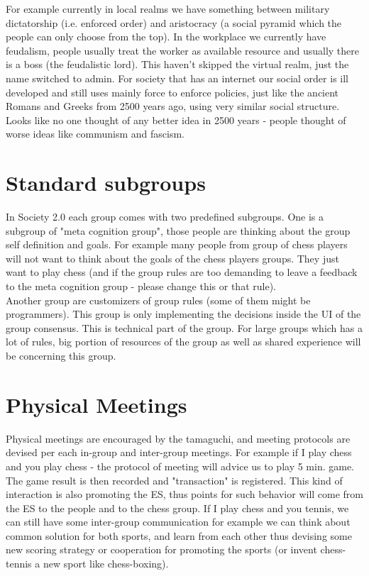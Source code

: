 \documentclass{article}
\begin{document}
For example currently in local realms we have something between military dictatorship (i.e. enforced order) and aristocracy (a social pyramid which the people can only choose from the top). In the workplace we currently have feudalism, people usually treat the worker as available resource and usually there is a boss (the feudalistic lord). This haven't skipped the virtual realm, just the name switched to admin. For society that has an internet our social order is ill developed and still uses mainly force to enforce policies, just like the ancient Romans and Greeks from 2500 years ago, using very similar social structure. Looks like no one thought of any better idea in 2500 years - people thought of worse ideas like communism and fascism. 

\section{Standard subgroups}

In Society 2.0 each group comes with two predefined subgroups. One is a subgroup of "meta cognition group", those people are thinking about the group self definition and goals. For example many people from group of chess players will not want to think about the goals of the chess players groups. They just want to play chess (and if the group rules are too demanding to leave a feedback to the meta cognition group - please change this or that rule). \\

Another group are customizers of group rules (some of them might be programmers). This group is only implementing the decisions inside the UI of the group consensus. This is technical part of the group. For large groups which has a lot of rules, big portion of resources of the group as well as shared experience will be concerning this group. 

\section{Physical Meetings}

Physical meetings are encouraged by the tamaguchi, and meeting protocols are devised per each in-group and inter-group meetings. For example if I play chess and you play chess - the protocol of meeting will advice us to play 5 min. game. The game result is then recorded and "transaction" is registered. This kind of interaction is also promoting the ES, thus points for such behavior will come from the ES to the people and to the chess group. If I play chess and you tennis, we can still have some inter-group communication for example we can think about common solution for both sports, and learn from each other thus devising some new scoring strategy or cooperation for promoting the sports (or invent chess-tennis a new sport like chess-boxing). \\
\end{document}
